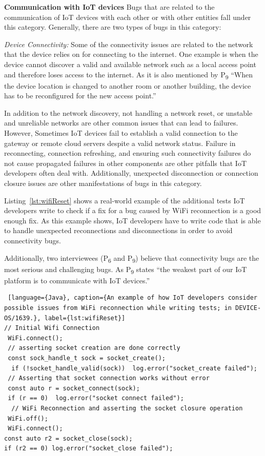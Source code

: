 \textbf{Communication with IoT devices}
Bugs that are related to the communication of IoT devices with each other or with other entities fall under this category. Generally, there are two types of bugs in this category:

\textit{Device Connectivity:} 
Some of the connectivity issues are related to the network that the device relies on for connecting to the internet. One example is when the device cannot discover a valid and available network such as a local access point and therefore loses access to the internet. As it is also mentioned by P\textsubscript{9} \enquote{When the device location is changed to another room or another building, the device has to be reconfigured for the new access point.}
 
In addition to the network discovery, not handling a network reset, or unstable and unreliable networks are other common issues that can lead to failures. However, Sometimes IoT devices fail to establish a valid connection to the gateway or remote cloud servers despite a valid network status. Failure in reconnecting, connection refreshing, and ensuring such connectivity failures do not cause propagated failures in other components are other pitfalls that IoT developers often deal with. Additionally, unexpected disconnection or connection closure issues are other manifestations of bugs in this category.

Listing~\autoref{lst:wifiReset} shows a real-world example of the additional tests IoT developers write to check if a fix for a bug caused by WiFi reconnection is a good enough fix. As this example shows, IoT developers have to write code that is able to handle unexpected reconnections and disconnections in order to avoid connectivity bugs.

Additionally, two interviewees (P\textsubscript{6} and P\textsubscript{9}) believe that connectivity bugs are the most serious and challenging bugs. As P\textsubscript{9} states \enquote{the weakest part of our IoT platform is to communicate with IoT devices.}

\begin{lstlisting} [language={Java}, caption={An example of how IoT developers consider possible issues from WiFi reconnection while writing tests; in DEVICE-OS/1639.}, label={lst:wifiReset}] 
// Initial Wifi Connection
 WiFi.connect();
 // asserting socket creation are done correctly
 const sock_handle_t sock = socket_create();
  if (!socket_handle_valid(sock))  log.error("socket_create failed");
 // Asserting that socket connection works without error
 const auto r = socket_connect(sock);
 if (r == 0)  log.error("socket connect failed");
  // WiFi Reconnection and asserting the socket closure operation
 WiFi.off();
 WiFi.connect();
const auto r2 = socket_close(sock);
if (r2 == 0) log.error("socket_close failed");
\end{lstlisting}


